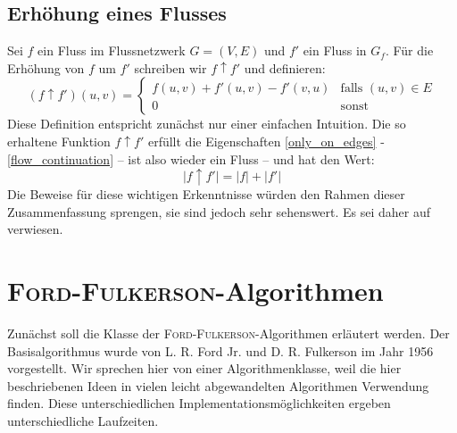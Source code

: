 \documentclass[12pt,a4paper,titlepage,onecolumn,ngerman,bibliography=totocnumbered]{scrartcl}
\theoremstyle{definition}
\theoremstyle{remark}
\newcommand{\ff}{\textsc{Ford-Fulkerson}}
\begin{document}
\subsection{Erhöhung eines Flusses}
Sei $f$ ein Fluss im Flussnetzwerk $G = (V,E)$ und $f'$ ein Fluss in $G_f$.
Für die Erhöhung von $f$ um $f'$ schreiben wir $f \uparrow f'$ und definieren:
\begin{equation}
    (f \uparrow f')(u,v)=
    \begin{cases}
    f(u,v) + f'(u,v) - f'(v,u) & \text{falls $(u,v) \in E$}\\
    0 & \text{sonst}
    \end{cases}
\end{equation}
Diese Definition entspricht zunächst nur einer einfachen Intuition.
\medbreak
Die so erhaltene Funktion $f\uparrow f'$ erfüllt die Eigenschaften \eqref{only_on_edges} - \eqref{flow_continuation} -- ist also wieder ein Fluss -- und hat den Wert:
\begin{equation}\label{flow_incr}
    \lvert f\uparrow f' \rvert = \lvert f \rvert + \lvert f'\rvert
\end{equation}
Die Beweise für diese wichtigen Erkenntnisse würden den Rahmen dieser Zusammenfassung sprengen, sie sind jedoch sehr sehenswert.
Es sei daher auf \cite[][S. 730-732]{Cormen09} verwiesen.


\section{\ff -Algorithmen}
Zunächst soll die Klasse der \ff -Algorithmen erläutert werden.
Der Basisalgorithmus wurde von L. R. Ford Jr. und D. R. Fulkerson im Jahr 1956 vorgestellt.
Wir sprechen hier von einer Algorithmenklasse, weil die hier beschriebenen Ideen in vielen leicht abgewandelten Algorithmen Verwendung finden.
Diese unterschiedlichen Implementationsmöglichkeiten ergeben unterschiedliche Laufzeiten.
\end{document}
